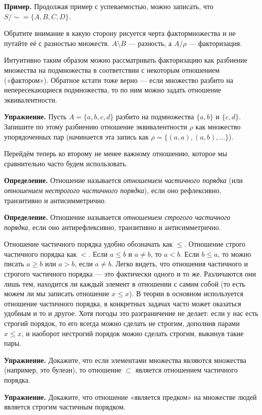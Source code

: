 {\bfseries Пример.} Продолжая пример с успеваемостью, можно записать, что $S/\sim = \{A, B, C, D\}$.

Обратите внимание в какую сторону рисуется черта фактормножества и не путайте её с разностью множеств. $A\setminus B$ — разность, а $A/\rho$ — факторизация.

Интуитивно таким образом можно рассматривать факторизацию как разбиение множества на подмножества в соответствии с некоторым отношением («фактором»). Обратное кстати тоже верно — если множество разбито на непересекающиеся подмножества, то по ним можно задать отношение эквивалентности.

{\bfseries Упражнение.} Пусть $A = \{a, b, c, d\}$ разбито на подмножества $\{a, b\}$ и $\{c, d\}$. Запишите по этому разбиению отношение эквивалентности $\rho$ как множество упорядоченных пар (начинается эта запись как $\rho = \{(a, a), (a, b), \ldots\}$).

Перейдём теперь ко второму не менее важному отношению, которое мы сравнительно часто будем использовать.

{\bfseries Определение.} Отношение называется {\slshape отношением частичного порядка} (или {\slshape отношением нестрогого частичного порядка}), если оно рефлексивно, транзитивно и антисимметрично.

{\bfseries Определение.} Отношение называется {\slshape отношением строгого частичного порядка}, если оно антирефлексивно, транзитивно и антисимметрично.

Отношение частичного порядка удобно обозначать как $\le$. Отношение строго частичного порядка как $<$. Если $a \le b$ и $a \not= b$, то $a<b$. Если $b \le a$, то можно писать $a \ge b$ или $a > b$, если $a\not= b$. Легко видеть, что отношения частичного и строгого частичного порядка — это фактически одного и то же. Различаются они лишь тем, находится ли каждый элемент в отношении с самим собой (то есть можем ли мы записать отношение $x\le x$). В теории в основном используется отношение частичного порядка, в конкретных задачах часто может оказаться удобным и то и другое. Хотя погоды это разграничение не делает: если у нас есть строгий порядок, то его всегда можно сделать не строгим, дополнив парами $x\le x$, и наоборот нестрогий порядок можно сделать строгим, выкинув такие пары.

{\bfseries Упражнение.} Докажите, что если элементами множества являются множества (например, это булеан), то отношение $\subset$ является отношением частичного порядка.

{\bfseries Упражнение.} Докажите, что отношение «является предком» на множестве людей является строгим частичным порядком.

